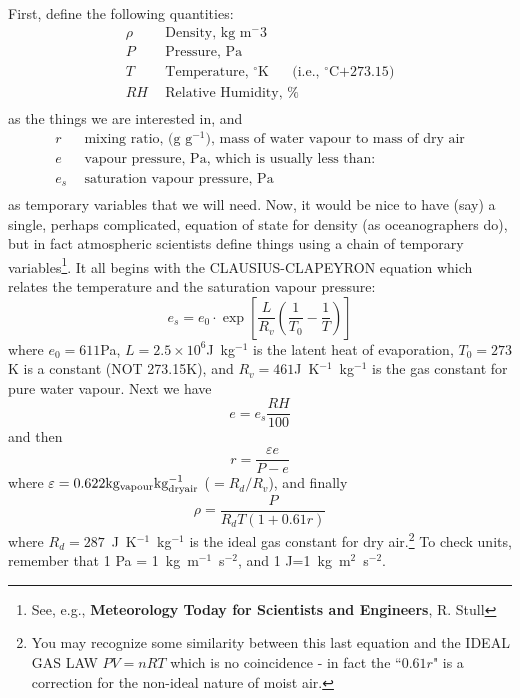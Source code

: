 \documentclass[letterpaper]{article}
\begin{document}
First, define the following quantities:
\begin{align}
\rho ~~& \text{Density,~kg~m$^-3$} \\
P ~~& \text{Pressure, Pa} \\
T ~~& \text{Temperature, $^{\circ}$K ~~~ (i.e., $^{\circ}$C+273.15}) \\
RH ~~& \text{Relative Humidity, \%} \\
\end{align}
as the things we are interested in, and
\begin{align}
r ~~& \text{mixing ratio, (g~g$^{-1}$), mass of water vapour to mass of dry air} \\
e ~~& \text{vapour pressure, Pa, which is usually less than:}\\
e_s ~~&  \text{saturation vapour pressure, Pa}\\
\end{align}
as temporary variables that we will need. Now, it would be nice to have (say)
a single, perhaps complicated, equation of state for density (as oceanographers do), but 
in fact atmospheric scientists define things using a chain of temporary 
variables\footnote{See, e.g., {\bf Meteorology Today for Scientists and
Engineers}, R. Stull}.
It all begins with the CLAUSIUS-CLAPEYRON equation which relates the temperature and the saturation vapour
pressure:
\begin{equation}
e_s = e_0 \cdot \exp \left[ \frac{L}{R_v} \left( \frac{1}{T_0} - \frac{1}{T}\right)\right]
\end{equation}
where $e_0 = 611$Pa, $L = 2.5\times10^6$J~kg$^{-1}$ is the latent heat of evaporation, $T_0 = 273$K is a constant (NOT
273.15K), and 
$R_v = 461$J~K$^{-1}$~kg$^{-1}$ is the gas constant for pure water vapour. Next we have
\begin{equation}
e = e_s \frac{RH}{100}
\end{equation}
and then
\begin{equation}
r = \frac{\varepsilon e}{P-e}
\end{equation}
where $\varepsilon = 0.622 {\rm kg_{vapour} kg_{dry air}^{-1}}$ ($=R_d/R_v$), and
finally
\begin{equation}
\rho = \frac{P}{ R_d T ( 1 + 0.61 r)}
\end{equation}
where $R_d = 287$~J~K$^{-1}$~kg$^{-1}$ is the ideal gas constant for dry air.\footnote{You may recognize some
similarity between this last equation and the IDEAL GAS LAW $PV=nRT$ which is no coincidence - in fact
the ``$0.61r$" is a correction for the non-ideal nature of moist air.} To check units, remember that 1 Pa = 1~kg~m$^{-1}$~s$^{-2}$, and 1 J=1~kg~m$^{2}$~s$^{-2}$.
\end{document}
